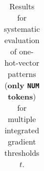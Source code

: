 \begin{table}[t]
\begin{tabular}{lllllll}

\hline
\end{tabular}
\caption[Model Evaluation for only \texttt{NUM} tokens]{Results for systematic evaluation of one-hot-vector patterns (\textbf{only \texttt{NUM} tokens}) for multiple integrated gradient thresholds $t$.}
\label{tab:evalResultsNUM}
\end{table}
	